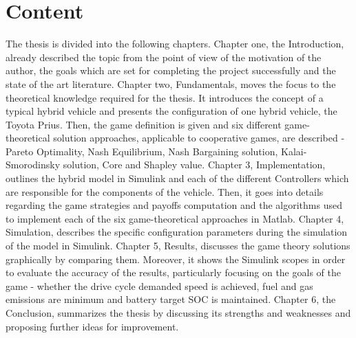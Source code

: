 \section{Content}
The thesis is divided into the following chapters. Chapter one, the Introduction, already described the topic from the point of view of the motivation of the author, the goals which are set for completing the project successfully and the state of the art literature. Chapter two, Fundamentals, moves the focus to the theoretical knowledge required for the thesis. It introduces the concept of a typical hybrid vehicle and presents the configuration of one hybrid vehicle, the Toyota Prius. Then, the game definition is given and six different game-theoretical solution approaches, applicable to cooperative games, are described - Pareto Optimality, Nash Equilibrium, Nash Bargaining solution, Kalai-Smorodinsky solution, Core and Shapley value. Chapter 3, Implementation, outlines the hybrid model in Simulink and each of the different Controllers which are responsible for the components of the vehicle. Then, it goes into details regarding the game strategies and payoffs computation and the algorithms used to implement each of the six game-theoretical approaches in Matlab. Chapter 4, Simulation, describes the specific configuration parameters during the simulation of the model in Simulink. Chapter 5, Results, discusses the game theory solutions graphically by comparing them. Moreover, it shows the Simulink scopes in order to evaluate the accuracy of the results, particularly focusing on the goals of the game - whether the drive cycle demanded speed is achieved, fuel and gas emissions are minimum and battery target SOC is maintained. Chapter 6, the Conclusion, summarizes the thesis by discussing its strengths and weaknesses and proposing further ideas for improvement.